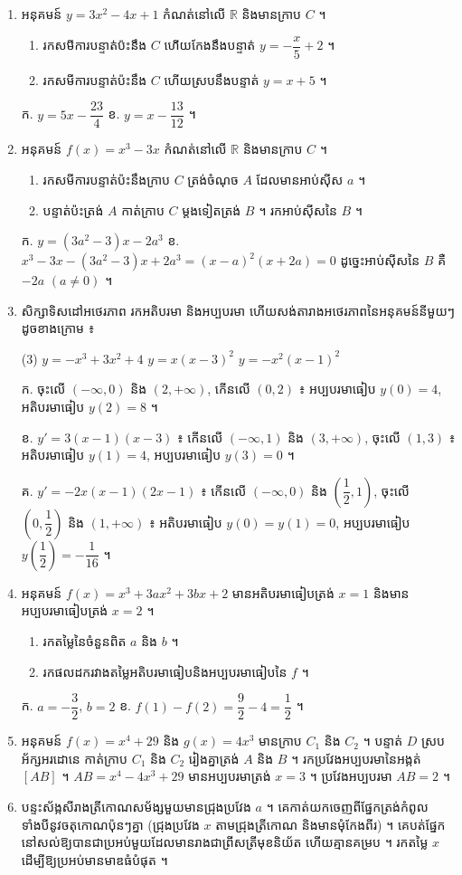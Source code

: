 \begin{enumerate}[1]
  \item អនុគមន៍ $y = 3x^2 - 4x + 1$ កំណត់នៅលើ $\mathbb{R}$ និងមានក្រាប $C$ ។
  \begin{enumerate}[a]
    \item រកសមីការបន្ទាត់ប៉ះនឹង $C$ ហើយកែងនឹងបន្ទាត់ $y = -\dfrac{x}{5} + 2$ ។
    \item រកសមីការបន្ទាត់ប៉ះនឹង $C$ ហើយស្របនឹងបន្ទាត់ $y = x + 5$ ។
  \end{enumerate}
  \ans
  ក. $y = 5x - \dfrac{23}{4}$ \quad ខ. $y = x - \dfrac{13}{12}$ ។
  \item អនុគមន៍ $f(x) = x^3 - 3x$ កំណត់នៅលើ $\mathbb{R}$ និងមានក្រាប $C$ ។
  \begin{enumerate}[a]
    \item រកសមីការបន្ទាត់ប៉ះនឹងក្រាប $C$ ត្រង់ចំណុច $A$ ដែលមានអាប់ស៊ីស $a$ ។
    \item បន្ទាត់ប៉ះត្រង់ $A$ កាត់ក្រាប $C$ ម្ដងទៀតត្រង់ $B$ ។ រកអាប់ស៊ីសនៃ $B$ ។
  \end{enumerate}
  \ans
  ក. $y = (3a^2 - 3)x - 2a^3$ \quad ខ. $x^3 - 3x - (3a^2 - 3)x + 2a^3 = (x - a)^2(x + 2a) = 0$ ដូច្នេះអាប់ស៊ីសនៃ $B$ គឺ $-2a$ $(a \ne 0)$ ។
  \item សិក្សាទិសដៅអថេរភាព រកអតិបរមា និងអប្បបរមា ហើយសង់តារាងអថេរភាពនៃអនុគមន៍នីមួយៗដូចខាងក្រោម ៖
  \begin{tasks}(3)
    \task $y = -x^3 + 3x^2 + 4$
    \task $y = x(x - 3)^2$
    \task $y = -x^2(x - 1)^2$
  \end{tasks}
  \ans
  ក. ចុះលើ $(-\infty, 0)$ និង $(2, +\infty)$, កើនលើ $(0, 2)$ ៖ អប្បបរមាធៀប $y(0) = 4$, អតិបរមាធៀប $y(2) = 8$ ។

  ខ. $y' = 3(x - 1)(x - 3)$ ៖ កើនលើ $(-\infty, 1)$ និង $(3, +\infty)$, ចុះលើ $(1, 3)$ ៖ អតិបរមាធៀប $y(1) = 4$, អប្បបរមាធៀប $y(3) = 0$ ។

  គ. $y' = -2x(x - 1)(2x - 1)$ ៖ កើនលើ $(-\infty, 0)$ និង $\left(\dfrac{1}{2}, 1\right)$, ចុះលើ $\left(0, \dfrac{1}{2}\right)$ និង $(1, +\infty)$ ៖ អតិបរមាធៀប $y(0) = y(1) = 0$, អប្បបរមាធៀប $y\left(\dfrac{1}{2}\right) = -\dfrac{1}{16}$ ។
  \item អនុគមន៍ $f(x) = x^3 + 3ax^2 + 3bx + 2$ មានអតិបរមាធៀបត្រង់ $x = 1$ និងមានអប្បបរមាធៀបត្រង់ $x = 2$ ។
  \begin{enumerate}[a]
    \item រកតម្លៃនៃចំនួនពិត $a$ និង $b$ ។
    \item រកផលដករវាងតម្លៃអតិបរមាធៀបនិងអប្បបរមាធៀបនៃ $f$ ។
  \end{enumerate}
  \ans
  ក. $a = -\dfrac{3}{2}$, $b = 2$ \quad ខ. $f(1) - f(2) = \dfrac{9}{2} - 4 = \dfrac{1}{2}$ ។
  \item អនុគមន៍ $f(x) = x^4 + 29$ និង $g(x) = 4x^3$ មានក្រាប $C_1$ និង $C_2$ ។ បន្ទាត់ $D$ ស្របអ័ក្សអរដោនេ កាត់ក្រាប $C_1$ និង $C_2$ រៀងគ្នាត្រង់ $A$ និង $B$ ។ រកប្រវែងអប្បបរមានៃអង្កត់ $[AB]$ ។
  \ans
  $AB = x^4 - 4x^3 + 29$ មានអប្បបរមាត្រង់ $x = 3$ ។ ប្រវែងអប្បបរមា $AB = 2$ ។
  \item បន្ទះស័ង្កសីរាងត្រីកោណសម័ង្សមួយមានជ្រុងប្រវែង $a$ ។ គេកាត់យកចេញពីផ្នែកត្រង់កំពូលទាំងបីនូវចតុកោណប៉ុនៗគ្នា (ជ្រុងប្រវែង $x$ តាមជ្រុងត្រីកោណ និងមានមុំកែងពីរ) ។ គេបត់ផ្នែកនៅសល់ឱ្យបានជាប្រអប់មួយដែលមានរាងជាព្រីសត្រីមុខនិយ័ត ហើយគ្មានគម្រប ។ រកតម្លៃ $x$ ដើម្បីឱ្យប្រអប់មានមាឌធំបំផុត ។


\end{enumerate}
